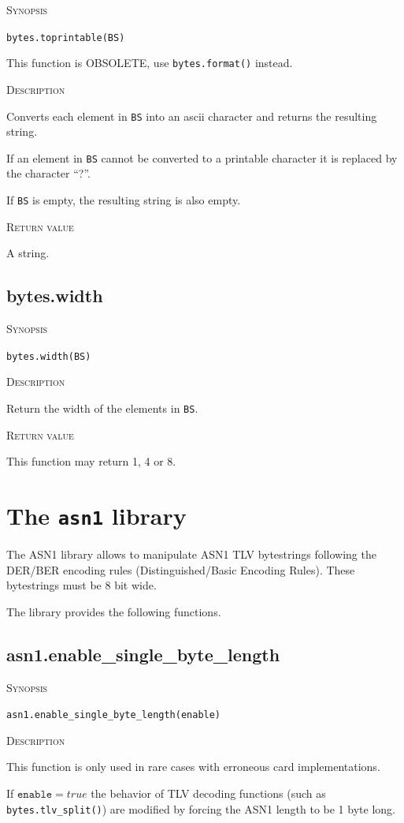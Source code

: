\documentclass[11pt]{report}
\newcommand{\mansection}[1]{\vspace{0.5em}\par\noindent\textsc{#1}\vspace{0.5em}\par}
\newcommand{\syn}[1]{\texttt{#1}}
\begin{document}
\mansection{Synopsis}
\syn{bytes.toprintable(BS)}

This function is OBSOLETE, use \syn{bytes.format()} instead.

\mansection{Description}
  Converts each element in \syn{BS} into an ascii character and returns the
  resulting string.

  If an element in \syn{BS} cannot be converted to a printable character it
  is replaced by the character ``?''. 

  If \syn{BS} is empty, the resulting string is also empty.

\mansection{Return value}
  A string.


\subsection{bytes.width}

\mansection{Synopsis}
\syn{bytes.width(BS)}

\mansection{Description}
  Return the width of the elements in \syn{BS}.

\mansection{Return value}
  This function may return 1, 4 or 8.


\section{The \syn{asn1} library}

The ASN1 library allows to manipulate ASN1 TLV bytestrings following the DER/BER 
encoding rules (Distinguished/Basic Encoding Rules).
These bytestrings must be 8 bit wide.

The library provides the following functions.


\subsection{asn1.enable\_single\_byte\_length}

\mansection{Synopsis}
\syn{asn1.enable\_single\_byte\_length(enable)}

\mansection{Description}
  This function is only used in rare cases with erroneous card implementations.
  
  If $\syn{enable}=true$ the behavior of TLV decoding functions 
  (such as \syn{bytes.tlv\_split()}) are modified by forcing the ASN1 
  length to be 1 byte long. 
  
\end{document}
